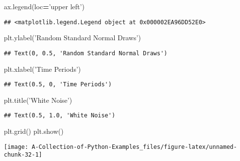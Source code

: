 \documentclass[
]{book}
\newenvironment{Shaded}{\begin{snugshade}}{\end{snugshade}}
\newcommand{\NormalTok}[1]{#1}
\newcommand{\OperatorTok}[1]{\textcolor[rgb]{0.81,0.36,0.00}{\textbf{#1}}}
\newcommand{\StringTok}[1]{\textcolor[rgb]{0.31,0.60,0.02}{#1}}
\begin{document}
\begin{Shaded}
\begin{Highlighting}[]
\NormalTok{ax.legend(loc}\OperatorTok{=}\StringTok{'upper left'}\NormalTok{)}
\end{Highlighting}
\end{Shaded}

\begin{verbatim}
## <matplotlib.legend.Legend object at 0x000002EA96DD52E0>
\end{verbatim}

\begin{Shaded}
\begin{Highlighting}[]
\NormalTok{plt.ylabel(}\StringTok{'Random Standard Normal Draws'}\NormalTok{)}
\end{Highlighting}
\end{Shaded}

\begin{verbatim}
## Text(0, 0.5, 'Random Standard Normal Draws')
\end{verbatim}

\begin{Shaded}
\begin{Highlighting}[]
\NormalTok{plt.xlabel(}\StringTok{'Time Periods'}\NormalTok{)}
\end{Highlighting}
\end{Shaded}

\begin{verbatim}
## Text(0.5, 0, 'Time Periods')
\end{verbatim}

\begin{Shaded}
\begin{Highlighting}[]
\NormalTok{plt.title(}\StringTok{'White Noise'}\NormalTok{)}
\end{Highlighting}
\end{Shaded}

\begin{verbatim}
## Text(0.5, 1.0, 'White Noise')
\end{verbatim}

\begin{Shaded}
\begin{Highlighting}[]
\NormalTok{plt.grid()}
\NormalTok{plt.show()}
\end{Highlighting}
\end{Shaded}

\begin{center}\texttt{[image: A-Collection-of-Python-Examples\_files/figure-latex/unnamed-chunk-32-1]} \end{center}
\end{document}

